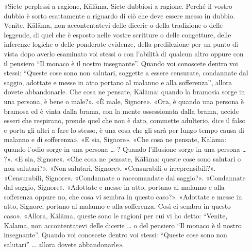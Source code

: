 «Siete perplessi a ragione, Kālāma. Siete dubbiosi a ragione. Perché il vostro
dubbio è sorto esattamente a riguardo di ciò che deve essere messo in dubbio.
Venite, Kālāma, non accontentatevi delle dicerie o della tradizione
o delle leggende, di quel che è esposto nelle vostre scritture o delle
congetture, delle inferenze logiche o delle ponderate evidenze, della
predilezione per un punto di vista dopo averlo esaminato voi stessi o con
l’abilità di qualcun altro oppure con il pensiero “Il monaco è il nostro
insegnante”. Quando voi conoscete dentro voi stessi: “Queste cose sono non
salutari, soggette a essere censurate, condannate dal saggio, adottate e messe
in atto portano al malanno e alla sofferenza”, allora dovete abbandonarle. Che
cosa ne pensate, Kālāma: quando la bramosia sorge in una persona, è bene o
male?». «È male, Signore». «Ora, è quando una persona è bramosa ed è vinta dalla
brama, con la mente ossessionata dalla brama, uccide esseri che respirano,
prende quel che non è dato, commette adulterio, dice il falso e porta gli altri
a fare lo stesso, è una cosa che gli sarà per lungo tempo causa di malanno e di
sofferenza». «E sia, Signore». «Che cosa ne pensate, Kālāma: quando l’odio sorge
in una persona … ? Quando l’illusione sorge in una persona … ?». «E sia,
Signore». «Che cosa ne pensate, Kālāma: queste cose sono salutari o non
salutari?». «Non salutari, Signore». «Censurabili o irreprensibili?».
«Censurabili, Signore». «Condannate o raccomandate dal saggio?». «Condannate dal
saggio, Signore». «Adottate e messe in atto, portano al malanno e alla
sofferenza oppure no, che cosa vi sembra in questo caso?». «Adottate e messe in
atto, Signore, portano al malanno e alla sofferenza. Così ci sembra in questo
caso». «Allora, Kālāma, queste sono le ragioni per cui vi ho detto: “Venite,
Kālāma, non accontentatevi delle dicerie … o del pensiero “Il monaco è il nostro
insegnante”. Quando voi conoscete dentro voi stessi: “Queste cose sono non
salutari” … allora dovete abbandonarle».

